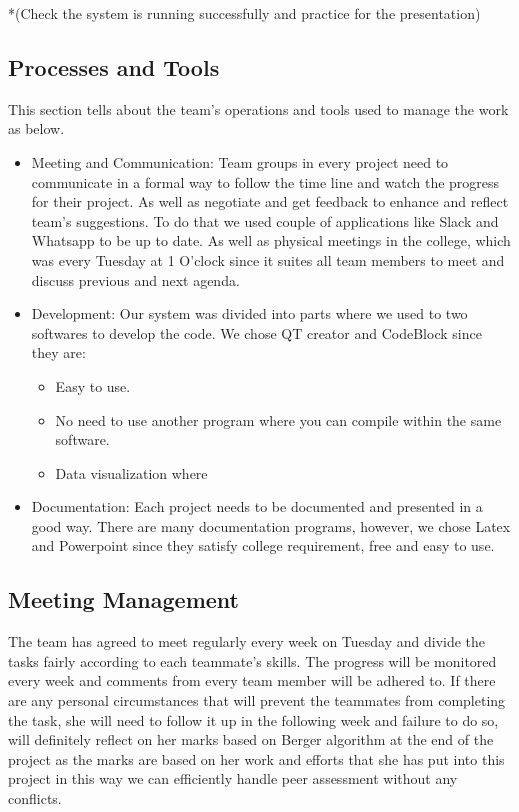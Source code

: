 \documentclass{article}
\begin{document}
*(Check the system is running successfully and practice for the presentation) 
 


\subsection{Processes and Tools}

This section tells about the team's operations and tools used to manage the work as below.   
\begin{itemize}


\item Meeting and Communication: Team groups in every project need to communicate in a formal way to follow the time line and watch the progress for their project. As well as negotiate and get feedback to enhance and reflect team’s suggestions. To do that we used couple of applications like Slack and Whatsapp to be up to date. As well as physical meetings in the college, which was every Tuesday at 1 O’clock since it suites all team members to meet and discuss previous and next agenda. 
\item Development: Our system was divided into parts where we used to two softwares to develop the code. We chose QT creator and CodeBlock since they are:
\begin{itemize}
\item 	Easy to use.
\item	No need to use another program where you can compile within the same software.
\item Data visualization where 

\end{itemize}
\item Documentation: Each project needs to be documented and presented in a good way. There are many documentation programs, however, we chose Latex and Powerpoint since they satisfy college requirement, free and easy to use. 


\end{itemize}



\subsection{Meeting Management} 
The team has agreed to meet regularly every week on Tuesday and divide the tasks fairly according to each teammate's skills. The progress will be monitored every week and comments from every team member will be adhered to. \newline If there are any personal circumstances that will prevent the teammates from completing the task, she will need to follow it up in the following week and failure to do so, will definitely reflect on her marks based on Berger algorithm at the end of the project as the marks are based on her work and efforts that she has put into this project in this way we can efficiently handle peer assessment without any conflicts. 
\end{document}
